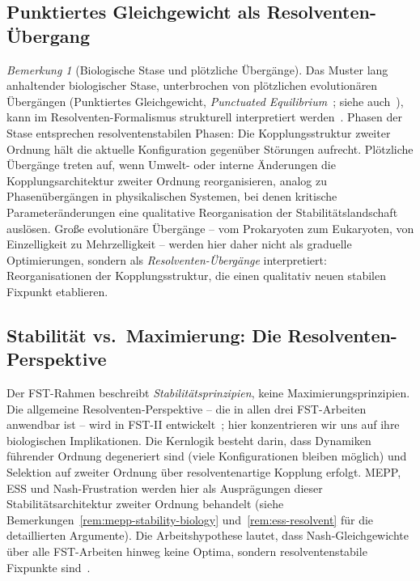 \documentclass[12pt,a4paper]{article}
\theoremstyle{remark}
\newtheorem{remark}{Bemerkung}
\begin{document}
\subsection{Punktiertes Gleichgewicht als Resolventen-Übergang}
\begin{remark}[Biologische Stase und plötzliche Übergänge]
\label{rem:punctuated-equilibrium}
Das Muster lang anhaltender biologischer Stase, unterbrochen von plötzlichen evolutionären Übergängen (Punktiertes Gleichgewicht, \emph{Punctuated Equilibrium}~\citep{GouldEldredge1977}; siehe auch~\citealp{KauffmanOrigins}), kann im Resolventen-Formalismus strukturell interpretiert werden~\citep{GeigerRH2026b}. Phasen der Stase entsprechen resolventenstabilen Phasen: Die Kopplungsstruktur zweiter Ordnung hält die aktuelle Konfiguration gegenüber Störungen aufrecht. Plötzliche Übergänge treten auf, wenn Umwelt- oder interne Änderungen die Kopplungsarchitektur zweiter Ordnung reorganisieren, analog zu Phasenübergängen in physikalischen Systemen, bei denen kritische Parameteränderungen eine qualitative Reorganisation der Stabilitätslandschaft auslösen. Große evolutionäre Übergänge -- vom Prokaryoten zum Eukaryoten, von Einzelligkeit zu Mehrzelligkeit -- werden hier daher nicht als graduelle Optimierungen, sondern als \emph{Resolventen-Übergänge} interpretiert: Reorganisationen der Kopplungsstruktur, die einen qualitativ neuen stabilen Fixpunkt etablieren.
\end{remark}

\subsection{Stabilität vs.\ Maximierung: Die Resolventen-Perspektive}

Der FST-Rahmen beschreibt \emph{Stabilitätsprinzipien}, keine Maximierungsprinzipien. Die allgemeine Resolventen-Perspektive -- die in allen drei FST-Arbeiten anwendbar ist -- wird in FST-II entwickelt~\citep{FSTII}; hier konzentrieren wir uns auf ihre biologischen Implikationen. Die Kernlogik besteht darin, dass Dynamiken führender Ordnung degeneriert sind (viele Konfigurationen bleiben möglich) und Selektion auf zweiter Ordnung über resolventenartige Kopplung erfolgt. MEPP, ESS und Nash-Frustration werden hier als Ausprägungen dieser Stabilitätsarchitektur zweiter Ordnung behandelt (siehe Bemerkungen~\ref{rem:mepp-stability-biology} und~\ref{rem:ess-resolvent} für die detaillierten Argumente). Die Arbeitshypothese lautet, dass Nash-Gleichgewichte über alle FST-Arbeiten hinweg keine Optima, sondern resolventenstabile Fixpunkte sind~\citep{GeigerRH2026b}.
\end{document}
